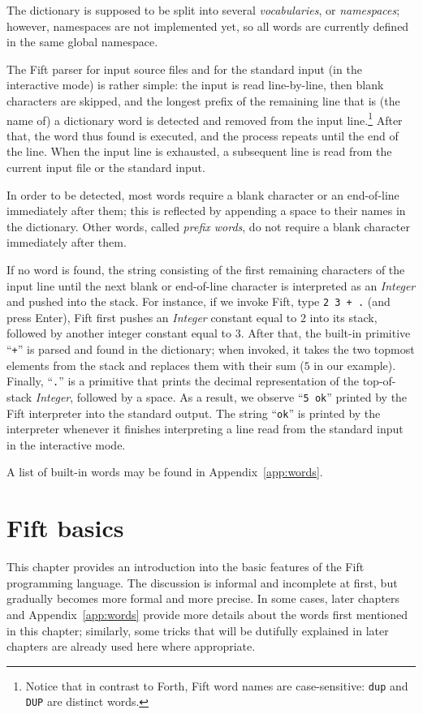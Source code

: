 \documentclass[12pt,oneside]{article}
\def\mysection#1{\section{#1}\fancyhead[C]{\textsc{Chapter \textbf{\thesection.} #1}}}
\begin{document}
The dictionary is supposed to be split into several {\em vocabularies}, or {\em name\-spaces}; however, namespaces are not implemented yet, so all words are currently defined in the same global namespace.

The Fift parser for input source files and for the standard input (in the interactive mode) is rather simple: the input is read line-by-line, then blank characters are skipped, and the longest prefix of the remaining line that is (the name of) a dictionary word is detected and removed from the input line.\footnote{Notice that in contrast to Forth, Fift word names are case-sensitive: {\tt dup} and {\tt DUP} are distinct words.} After that, the word thus found is executed, and the process repeats until the end of the line. When the input line is exhausted, a subsequent line is read from the current input file or the standard input.

In order to be detected, most words require a blank character or an end-of-line immediately after them; this is reflected by appending a space to their names in the dictionary. Other words, called {\em prefix words}, do not require a blank character immediately after them.

If no word is found, the string consisting of the first remaining characters of the input line until the next blank or end-of-line character is interpreted as an {\em Integer\/} and pushed into the stack. For instance, if we invoke Fift, type {\tt 2 3 + .} (and press Enter), Fift first pushes an {\em Integer\/} constant equal to $2$ into its stack, followed by another integer constant equal to $3$. After that, the built-in primitive ``{\tt +}'' is parsed and found in the dictionary; when invoked, it takes the two topmost elements from the stack and replaces them with their sum ($5$ in our example). Finally, ``{\tt .}'' is a primitive that prints the decimal representation of the top-of-stack {\em Integer}, followed by a space. As a result, we observe ``{\tt 5 ok}'' printed by the Fift interpreter into the standard output. The string ``{\tt ok}'' is printed by the interpreter whenever it finishes interpreting a line read from the standard input in the interactive mode.

A list of built-in words may be found in Appendix~\ref{app:words}.

\mysection{Fift basics}
This chapter provides an introduction into the basic features of the Fift programming language. The discussion is informal and incomplete at first, but gradually becomes more formal and more precise. In some cases, later chapters and Appendix~\ref{app:words} provide more details about the words first mentioned in this chapter; similarly, some tricks that will be dutifully explained in later chapters are already used here where appropriate.
\end{document}
